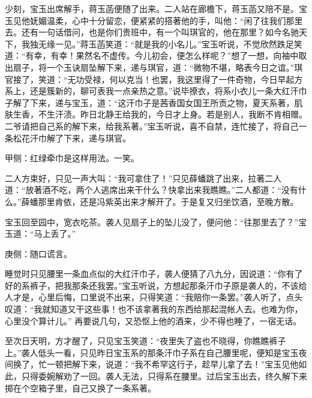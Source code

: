 \begin{parag}
    少刻，宝玉出席解手，蒋玉菡便随了出来。二人站在廊檐下，蒋玉菡又陪不是。宝玉见他妩媚温柔，心中十分留恋，便紧紧的搭著他的手，叫他：“闲了往我们那里去。还有一句话借问，也是你们贵班中，有一个叫琪官的，他在那里？如今名驰天下，我独无缘一见。”蒋玉菡笑道：“就是我的小名儿。”宝玉听说，不觉欣然跌足笑道：“有幸，有幸！果然名不虚传。今儿初会，便怎么样呢？”想了一想，向袖中取出扇子，将一个玉诀扇坠解下来，递与琪官，道：“微物不堪，略表今日之谊。”琪官接了，笑道：“无功受禄，何以克当！也罢，我这里得了一件奇物，今日早起方系上，还是簇新的，聊可表我一点亲热之意。”说毕撩衣，将系小衣儿一条大红汗巾子解了下来，递与宝玉，道：“这汗巾子是茜香国女国王所贡之物，夏天系著，肌肤生香，不生汗渍。昨日北静王给我的，今日才上身。若是别人，我断不肯相赠。二爷请把自己系的解下来，给我系著。”宝玉听说，喜不自禁，连忙接了，将自己一条松花汗巾解了下来，递与琪官。\begin{note}甲侧：红绿牵巾是这样用法。一笑。\end{note}二人方束好，只见一声大叫：“我可拿住了！”只见薛蟠跳了出来，拉著二人道：“放著酒不吃，两个人逃席出来干什么？快拿出来我瞧瞧。”二人都道：“没有什么。”薛蟠那里肯依，还是冯紫英出来才解开了。于是复又归坐饮酒，至晚方散。
\end{parag}


\begin{parag}
    宝玉回至园中，宽衣吃茶。袭人见扇子上的坠儿没了，便问他：“往那里去了？”宝玉道：“马上丢了。”\begin{note}庚侧：随口谎言。\end{note}睡觉时只见腰里一条血点似的大红汗巾子，袭人便猜了八九分，因说道：“你有了好的系裤子，把我那条还我罢。”宝玉听说，方想起那条汗巾子原是袭人的，不该给人才是，心里后悔，口里说不出来，只得笑道：“我赔你一条罢。”袭人听了，点头叹道：“我就知道又干这些事！也不该拿著我的东西给那起混帐人去。也难为你，心里没个算计儿。” 再要说几句，又恐怄上他的酒来，少不得也睡了，一宿无话。
\end{parag}


\begin{parag}
    至次日天明，方才醒了，只见宝玉笑道：“夜里失了盗也不晓得，你瞧瞧裤子上。”袭人低头一看，只见昨日宝玉系的那条汗巾子系在自己腰里呢，便知是宝玉夜间换了，忙一顿把解下来，说道：“我不希罕这行子，趁早儿拿了去！”宝玉见他如此，只得委婉解劝了一回。袭人无法，只得系在腰里。过后宝玉出去，终久解下来掷在个空箱子里，自己又换了一条系著。
\end{parag}


